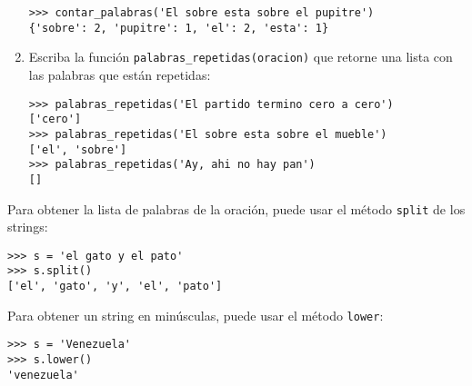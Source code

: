 \begin{enumerate}
\begin{lstlisting}
>>> contar_palabras('El sobre esta sobre el pupitre')
{'sobre': 2, 'pupitre': 1, 'el': 2, 'esta': 1}
\end{lstlisting}
\item
  Escriba la función \lstinline!palabras_repetidas(oracion)! que retorne
  una lista con las palabras que están repetidas:

\begin{lstlisting}
>>> palabras_repetidas('El partido termino cero a cero')
['cero']
>>> palabras_repetidas('El sobre esta sobre el mueble')
['el', 'sobre']
>>> palabras_repetidas('Ay, ahi no hay pan')
[]
\end{lstlisting}
\end{enumerate}

Para obtener la lista de palabras de la oración, puede usar el método
\lstinline!split! de los strings:

\begin{lstlisting}
>>> s = 'el gato y el pato'
>>> s.split()
['el', 'gato', 'y', 'el', 'pato']
\end{lstlisting}

Para obtener un string en minúsculas, puede usar el método
\lstinline!lower!:

\begin{lstlisting}
>>> s = 'Venezuela'
>>> s.lower()
'venezuela'
\end{lstlisting}

